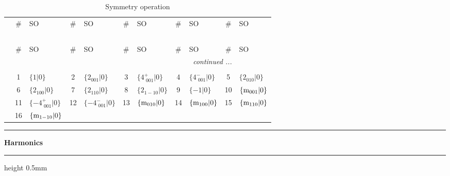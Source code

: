 \documentclass[fleqn,10pt,landscape]{jsarticle}
\begin{document}
\renewcommand{\arraystretch}{1.6}
\begin{longtable}[l]{c|cl|cl|cl|cl|cl}
\captionsetup{justification=raggedright, singlelinecheck=off}
\caption{Symmetry operation}
 \\
 \hline \hline
 & \# & SO & \# & SO & \# & SO & \# & SO & \# & SO \\ \hline \endfirsthead

\multicolumn{10}{l}{\tablename\ \thetable{}} \\
 \hline \hline
 & \# & SO & \# & SO & \# & SO & \# & SO & \# & SO \\ \hline \endhead

 \hline \hline
\multicolumn{10}{r}{\footnotesize\it continued ...} \\ \endfoot

 \hline \hline
\multicolumn{10}{r}{} \\ \endlastfoot

 & 1 & $\{1|0\}$ & 2 & $\{2{}_{001}|0\}$ & 3 & $\{4^{+}_{\,\,001}|0\}$ & 4 & $\{4^{-}_{\,\,001}|0\}$ & 5 & $\{2{}_{010}|0\}$ \\
& 6 & $\{2{}_{100}|0\}$ & 7 & $\{2{}_{110}|0\}$ & 8 & $\{2{}_{1-10}|0\}$ & 9 & $\{-1|0\}$ & 10 & $\{{\rm m}_{001}|0\}$ \\
& 11 & $\{-4^{+}_{\,\,001}|0\}$ & 12 & $\{-4^{-}_{\,\,001}|0\}$ & 13 & $\{{\rm m}_{010}|0\}$ & 14 & $\{{\rm m}_{100}|0\}$ & 15 & $\{{\rm m}_{110}|0\}$ \\
& 16 & $\{{\rm m}_{1-10}|0\}$ &  &  &  &  &  &  &  &  \\
\end{longtable}
\vspace{5mm}
\noindent \rule[0.5mm]{5mm}{0.5mm}\hspace{3mm}\textbf{Harmonics}\hspace{3mm}\leaders\hrule height 0.5mm\hfill\kern0pt
\vspace{3mm}
\end{document}
